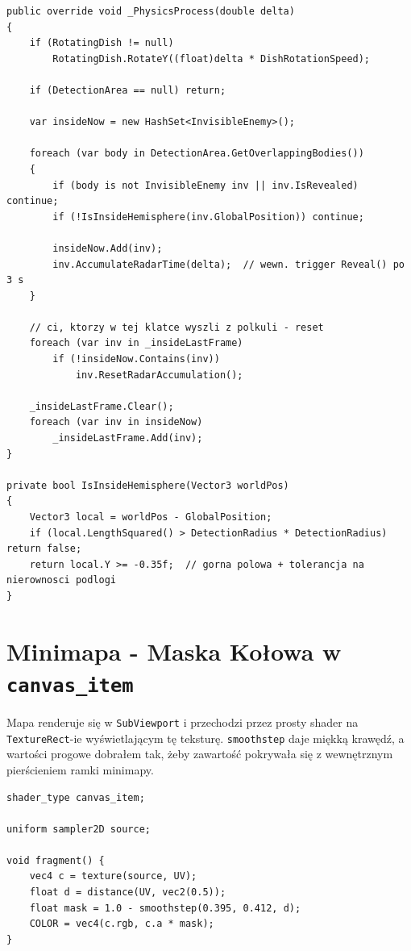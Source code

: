 \begin{lstlisting}[caption={Radar.cs - akumulacja czasu w polkuli (skrocone)},label={lst:radar}]
public override void _PhysicsProcess(double delta)
{
    if (RotatingDish != null)
        RotatingDish.RotateY((float)delta * DishRotationSpeed);

    if (DetectionArea == null) return;

    var insideNow = new HashSet<InvisibleEnemy>();

    foreach (var body in DetectionArea.GetOverlappingBodies())
    {
        if (body is not InvisibleEnemy inv || inv.IsRevealed) continue;
        if (!IsInsideHemisphere(inv.GlobalPosition)) continue;

        insideNow.Add(inv);
        inv.AccumulateRadarTime(delta);  // wewn. trigger Reveal() po 3 s
    }

    // ci, ktorzy w tej klatce wyszli z polkuli - reset
    foreach (var inv in _insideLastFrame)
        if (!insideNow.Contains(inv))
            inv.ResetRadarAccumulation();

    _insideLastFrame.Clear();
    foreach (var inv in insideNow)
        _insideLastFrame.Add(inv);
}

private bool IsInsideHemisphere(Vector3 worldPos)
{
    Vector3 local = worldPos - GlobalPosition;
    if (local.LengthSquared() > DetectionRadius * DetectionRadius) return false;
    return local.Y >= -0.35f;  // gorna polowa + tolerancja na nierownosci podlogi
}
\end{lstlisting}

\section{Minimapa - Maska Kołowa w \texttt{canvas\_item}}

Mapa renderuje się w \texttt{SubViewport} i przechodzi przez prosty shader na \texttt{TextureRect}-ie wyświetlającym tę teksturę. \texttt{smoothstep} daje miękką krawędź, a wartości progowe dobrałem tak, żeby zawartość pokrywała się z wewnętrznym pierścieniem ramki minimapy.

\begin{lstlisting}[caption={Shaders/minimap\_mask.gdshader - maska kolowa},label={lst:mini-mask},language={}]
shader_type canvas_item;

uniform sampler2D source;

void fragment() {
    vec4 c = texture(source, UV);
    float d = distance(UV, vec2(0.5));
    float mask = 1.0 - smoothstep(0.395, 0.412, d);
    COLOR = vec4(c.rgb, c.a * mask);
}
\end{lstlisting}

